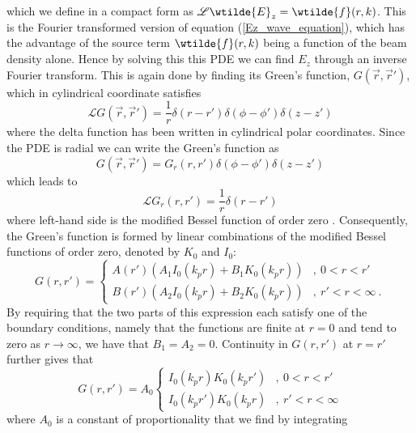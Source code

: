 which we define in a compact form as $\mathscr{L}\wtilde{E}_z= \wtilde{f}(r,k)$. This is the Fourier transformed version of equation (\ref{Ez_wave_equation}), which has the advantage of the source term $\wtilde{f}(r,k)$ being a function of the beam density alone. Hence by solving this this PDE we can find $E_z$ through an inverse Fourier transform. This is again done by finding its Green's function, $G(\vec{r},\vec{r}')$, which in cylindrical coordinate satisfies
\begin{equation}
\mathscr{L}G(\vec{r},\vec{r}')=\frac{1}{r}\delta(r-r')\delta(\phi-\phi')\delta(z-z')
\end{equation}
where the delta function has been written in cylindrical polar coordinates. Since the PDE is radial we can write the Green's function as
\begin{equation}
G(\vec{r},\vec{r}')=G_r(r,r')\delta(\phi-\phi')\delta(z-z')
\end{equation}
which leads to 
\begin{equation}
\mathscr{L}G_r(r,r')=\frac{1}{r}\delta(r-r')
\label{greens_diff_eq}
\end{equation}
where left-hand side is the modified Bessel function of order zero \cite{Jackson1962}. Consequently, the Green's function is formed by linear combinations of the modified Bessel functions of order zero, denoted by $K_0$ and $I_0$: %
\begin{equation}
G\left(r,r'\right)=\left\{ \begin{array}{ll}
A(r')(A_1 I_0(k_pr)+B_1K_0(k_pr)) &,~ 0<r<r'\\
B(r')(A_2 I_0(k_pr)+B_2K_0(k_pr))  &,~ r'<r<\infty~.
\end{array}\right.
\end{equation} %
By requiring that the two parts of this expression each satisfy one of the boundary conditions, namely that the functions are finite at $r=0$ and tend to zero as $r\to\infty$, we have that $B_1=A_2=0$. Continuity in $G(r,r')$ at $r=r'$ further gives that 
\begin{equation}
G\left(r,r'\right)=A_0\left\{ \begin{array}{ll}
I_0(k_pr)K_0(k_pr') &,~ 0<r<r'\\
I_0(k_pr')K_0(k_pr)  &,~ r'<r<\infty
\end{array}\right.
\end{equation}
where $A_0$ is a constant of proportionality that we find by integrating %
